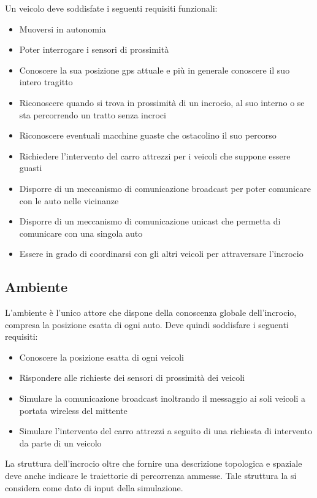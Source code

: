 \documentclass{memoir}
\begin{document}
Un veicolo deve soddisfate i seguenti requisiti funzionali:
\begin{itemize}
\item Muoversi in autonomia
\item Poter interrogare i sensori di prossimità
\item Conoscere la sua posizione gps attuale e più in generale conoscere il suo
  intero tragitto
\item Riconoscere quando si trova in prossimità di un incrocio, al suo interno o
  se sta percorrendo un tratto senza incroci
\item Riconoscere eventuali macchine guaste che ostacolino il suo percorso
\item Richiedere l'intervento del carro attrezzi per i veicoli che suppone
  essere guasti
\item Disporre di un meccanismo di comunicazione broadcast per poter comunicare
  con le auto nelle vicinanze
\item Disporre di un meccanismo di comunicazione unicast che permetta di
  comunicare con una singola auto
\item Essere in grado di coordinarsi con gli altri veicoli per attraversare
  l'incrocio
\end{itemize}

\subsection{Ambiente}

L'ambiente è l'unico attore che dispone della conoscenza globale dell'incrocio,
compresa la posizione esatta di ogni auto. Deve quindi soddisfare i seguenti
requisiti:
\begin{itemize}
\item Conoscere la posizione esatta di ogni veicoli
\item Rispondere alle richieste dei sensori di prossimità dei veicoli
\item Simulare la comunicazione broadcast inoltrando il messaggio ai soli
  veicoli a portata wireless del mittente
\item Simulare l'intervento del carro attrezzi a seguito di una richiesta di
  intervento da parte di un veicolo
\end{itemize}

La struttura dell'incrocio oltre che fornire una descrizione topologica e
spaziale deve anche indicare le traiettorie di percorrenza ammesse. Tale
struttura la si considera come dato di input della simulazione.
\end{document}
